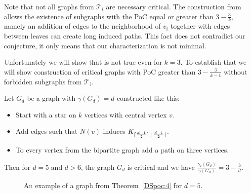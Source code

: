 Note that not all graphs from \(\mathcal{T}_i\) are necessary critical. 
The construction from  allows the existence of subgraphs with the PoC equal or greater than \(3 - \frac{3}{k}\), namely 
an addition of edges to the neighborhood of \(v_i\) together with edges between leaves can create long induced paths.
This fact does not contradict our conjecture, it only means that our characterization is not minimal.

Unfortunately we will show that  is not true even for \(k = 3\).
To establish that we will show construction of critical graphs with PoC greater than \(3 - \frac{3}{k-1}\) without forbidden subgraphs from \(\mathcal{T}_i\).
\begin{thm}\label{DSpoc:4}
Let \(G_d\) be a graph with \(\gamma(G_d) = d\) constructed like this:
\begin{itemize}
	\item Start with a star on \(k\) vertices with central vertex \(v\).
	\item Add edges such that \(N(v)\) induces \(K_{\lceil\frac{d-1}{2}\rceil, \lfloor\frac{d-1}{2}\rfloor}\). 
	\item To every vertex from the bipartite graph add a path on three vertices.
\end{itemize}
	Then for \(d = 5\) and \(d > 6\), the graph \(G_d\) is critical and we have \(\frac{\gamma_c(G_d)}{\gamma(G_d)} = {3 - \frac{3}{d}}\).
\end{thm}

\begin{figure}
	 \centering
         
	 \caption{An example of a graph from Theorem~\ref{DSpoc:4} for $d = 5$.}
\end{figure}

